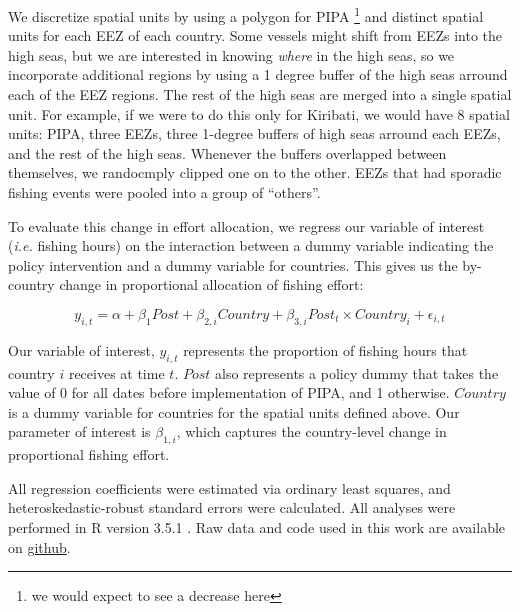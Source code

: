 \documentclass[11pt,]{article}
\let\rmarkdownfootnote\footnote%
\def\footnote{\protect\rmarkdownfootnote}
\begin{document}
We discretize spatial units by using a polygon for PIPA
\footnote{we would expect to see a decrease here} and distinct spatial
units for each EEZ of each country. Some vessels might shift from EEZs
into the high seas, but we are interested in knowing \emph{where} in the
high seas, so we incorporate additional regions by using a 1 degree
buffer of the high seas arround each of the EEZ regions. The rest of the
high seas are merged into a single spatial unit. For example, if we were
to do this only for Kiribati, we would have 8 spatial units: PIPA, three
EEZs, three 1-degree buffers of high seas arround each EEZs, and the
rest of the high seas. Whenever the buffers overlapped between
themselves, we randocmply clipped one on to the other. EEZs that had
sporadic fishing events were pooled into a group of ``others''.

To evaluate this change in effort allocation, we regress our variable of
interest (\emph{i.e.} fishing hours) on the interaction between a dummy
variable indicating the policy intervention and a dummy variable for
countries. This gives us the by-country change in proportional
allocation of fishing effort:

\[
y_{i,t} = \alpha + \beta_1Post + \beta_{2,i}Country + \beta_{3,i}Post_t \times Country_i + \epsilon_{i,t}
\]

Our variable of interest, \(y_{i,t}\) represents the proportion of
fishing hours that country \(i\) receives at time \(t\). \(Post\) also
represents a policy dummy that takes the value of 0 for all dates before
implementation of PIPA, and 1 otherwise. \(Country\) is a dummy variable
for countries for the spatial units defined above. Our parameter of
interest is \(\beta_{1,i}\), which captures the country-level change in
proportional fishing effort.

All regression coefficients were estimated via ordinary least squares,
and heteroskedastic-robust standard errors were calculated. All analyses
were performed in R version 3.5.1 \citep{rcore_2018}. Raw data and code
used in this work are available on
\href{https://github.com/jcvdav/MPA_displacement}{github}.
\end{document}

